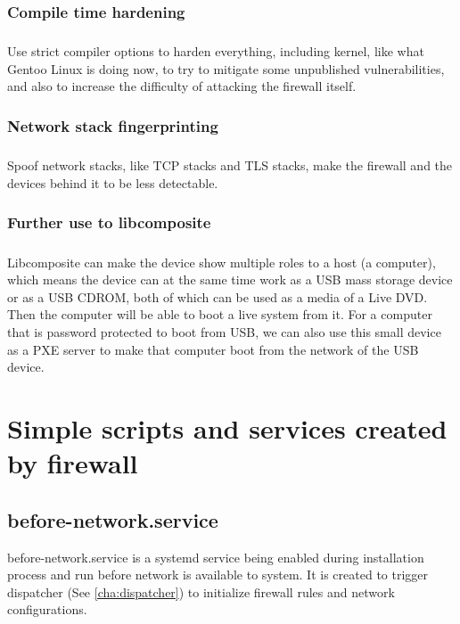 \documentclass[mscthesis]{usiinfthesis}
\begin{document}
\subsection{Compile time hardening}
\paragraph{}
Use strict compiler options to harden everything, including kernel, like what Gentoo Linux is doing now, to try to mitigate some unpublished vulnerabilities, and also to increase the difficulty of attacking the firewall itself.

\subsection{Network stack fingerprinting}
\paragraph{}
Spoof network stacks, like TCP stacks and TLS stacks, make the firewall and the devices behind it to be less detectable.

\subsection{Further use to libcomposite}
\paragraph{}
Libcomposite can make the device show multiple roles to a host (a computer), which means the device can at the same time work as a USB mass storage device or as a USB CDROM, both of which can be used as a media of a Live DVD. Then the computer will be able to boot a live system from it. For a computer that is password protected to boot from USB, we can also use this small device as a PXE server to make that computer boot from the network of the USB device.

\appendix

\chapter{Simple scripts and services created by firewall}

\section{before-network.service}\label{sec:before-network-service}
before-network.service is a systemd service being enabled during installation process and run before network is available to system. It is created to trigger dispatcher (See \cref{cha:dispatcher}) to initialize firewall rules and network configurations.
\end{document}
